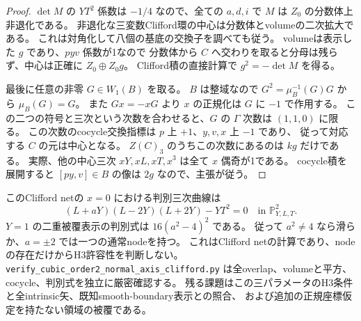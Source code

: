 \begin{proof}
$\det M$ の $YT^2$ 係数は $-1/4$ なので、全ての $a,d,i$ で
$M$ は $Z_0$ の分数体上非退化である。
非退化な三変数Clifford環の中心は分数体とvolumeの二次拡大である。
これは対角化して八個の基底の交換子を調べても従う。
volumeは表示した $g$ であり、$pyv$ 係数が1なので
分数体から $C$ へ交わりを取ると分母は残らず、中心は正確に $Z_0\oplus Z_0g$。
Clifford積の直接計算で $g^2=-\det M$ を得る。

最後に任意の非零 $G\in W_1(B)$ を取る。
$B$ は整域なので $G^2=\mu_B^{-1}(G)G$ から $\mu_B(G)=G$。
また $Gx=-xG$ より $x$ の正規化は $G$ に $-1$ で作用する。
この二つの符号と三次という次数を合わせると、$G$ の $\Gamma$ 次数は $(1,1,0)$ に限る。
この次数のcocycle交換指標は $p$ 上 $+1$、$y,v,x$ 上 $-1$ であり、
従って対応する $C$ の元は中心となる。
$Z(C)_3$ のうちこの次数にあるのは $kg$ だけである。
実際、他の中心三次 $xY,xL,xT,x^3$ は全て $x$ 偶奇が1である。
cocycle積を展開すると $[py,v]\in B$ の像は $2g$ なので、主張が従う。
\end{proof}

このClifford netの $x=0$ における判別三次曲線は
\[
 (L+aY)(L-2Y)(L+2Y)-YT^2=0\quad\text{in }\mathbb P^2_{Y,L,T}.
\]
$Y=1$ の二重被覆表示の判別式は $16(a^2-4)^2$ である。
従って $a^2\ne4$ なら滑らか、$a=\pm2$ では一つの通常nodeを持つ。
これはClifford netの計算であり、nodeの存在だけからH3許容性を判断しない。
\texttt{verify\_\allowbreak{}cubic\_\allowbreak{}order2\_\allowbreak{}normal\_\allowbreak{}axis\_\allowbreak{}clifford.py}
は全overlap、volumeと平方、cocycle、判別式を独立に厳密確認する。
残る課題はこの三パラメータのH3条件と全intrinsic矢、既知smooth-boundary表示との照合、
および追加の正規座標仮定を持たない領域の被覆である。

